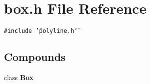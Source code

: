 \section{box.h File Reference}
\label{box_8h}
{\tt \#include \char`\"{}polyline.h\char`\"{}}\par
\subsection*{Compounds}
\begin{CompactItemize}
\item 
class {\bf Box}
\end{CompactItemize}

